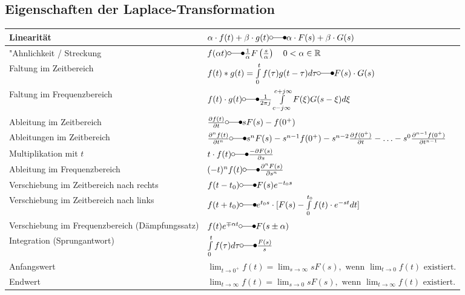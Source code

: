  	\subsection{Eigenschaften der Laplace-Transformation}
  		\renewcommand{\arraystretch}{2}
		\begin{tabular}{|l|l|}
        	\hline
        	Linearität & 
 			$\alpha\cdot f(t) + \beta\cdot g(t) \laplace \alpha\cdot F(s) + \beta\cdot
 			G(s)$ \\
 			\hline
 			"Ahnlichkeit / Streckung &
 			$f(\alpha t) \laplace \frac{1}{\alpha}F \left (\frac{s}{\alpha} \right ) \quad 0
 			<\alpha \in\mathbb{R}$ \\
 			\hline
 			Faltung im Zeitbereich &
 			$f(t) \ast g(t) = \int\limits_{0}^{t} f(\tau)g(t-\tau)d\tau \laplace F(s)
 			\cdot G(s)$\\
 			\hline
 			Faltung im Frequenzbereich &
 			$f(t) \cdot g(t) \laplace \frac{1}{2\pi j}\int\limits_{c-j\infty}^{c+j\infty}
 			F(\xi) G(s-\xi)d\xi$ \\
 			\hline
 			Ableitung im Zeitbereich &
 			$\frac{\partial f(t)}{\partial t} \laplace sF(s)
 			-f(0^+)$ \\
 			\hline
 			Ableitungen im Zeitbereich &
 			$\frac{\partial^n f(t)}{\partial t^n} \laplace s^nF(s)
 			-s^{n-1}f(0^+)-s^{n-2}\frac{\partial f(0^+)}{\partial t}-\ldots
 			-s^0\frac{\partial^{n-1} f(0^+)}{\partial t^{n-1}}$ \\
 			\hline
 			Multiplikation mit $t$ &
 			$t\cdot f(t)  \laplace \frac{-\partial F(s)}{\partial s}$ \\
 			\hline
 			Ableitung im Frequenzbereich &
 			$(-t)^n f(t) \laplace  \frac{\partial^n F(s)}{\partial s^n}$ \\
 			\hline
 			Verschiebung im Zeitbereich nach rechts &
 			$f(t - t_0) \laplace F(s)e^{- t_0 s}$ \\
 			\hline
			Verschiebung im Zeitbereich nach links &
			$f(t + t_0) \laplace e^{t_0 s} \cdot [F(s) - \int\limits_0^{t_0} f(t) \cdot e^{-st} dt]$\\
			\hline
 			Verschiebung im Frequenzbereich (Dämpfungssatz) &
 			$f(t)e^{\mp\alpha t} \laplace F(s\pm\alpha)$ \\
 			\hline
 			Integration (Sprungantwort)&
 			$\int\limits_0^t f(\tau)d\tau \laplace \frac{F(s)}{s}$ \\
 			\hline
 			Anfangswert &
 			$\lim_{t\rightarrow 0^+} f(t) = \lim_{s\rightarrow \infty} sF(s),\text{~wenn
 			}  \lim_{t\rightarrow 0} f(t)\text{~existiert}.$ \\
 			\hline
 			Endwert &
 			$\lim_{t\rightarrow \infty} f(t) = \lim_{s\rightarrow 0} sF(s),\text{~wenn
 			}  \lim_{t\rightarrow \infty} f(t)\text{~existiert}.$ \\
 			\hline
       	\end{tabular}
		\renewcommand{\arraystretch}{\arraystretchOriginal}
	
